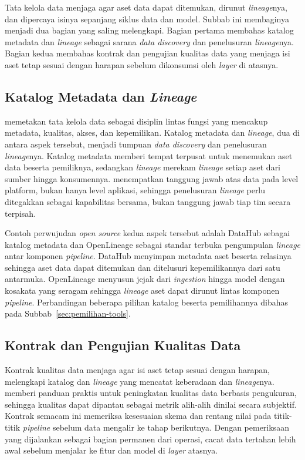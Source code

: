 Tata kelola data menjaga agar aset data dapat ditemukan, dirunut \textit{lineage}nya, dan dipercaya isinya sepanjang siklus data dan model. Subbab ini membaginya menjadi dua bagian yang saling melengkapi. Bagian pertama membahas katalog metadata dan \textit{lineage} sebagai sarana \textit{data discovery} dan penelusuran \textit{lineage}nya. Bagian kedua membahas kontrak dan pengujian kualitas data yang menjaga isi aset tetap sesuai dengan harapan sebelum dikonsumsi oleh \textit{layer} di atasnya.

\subsection{Katalog Metadata dan \textit{Lineage}}
\label{subsec:teori-katalog-lineage}

\textcite{bernardo2024data} memetakan tata kelola data sebagai disiplin lintas fungsi yang mencakup metadata, kualitas, akses, dan kepemilikan. Katalog metadata dan \textit{lineage}, dua di antara aspek tersebut, menjadi tumpuan \textit{data discovery} dan penelusuran \textit{lineage}nya. Katalog metadata memberi tempat terpusat untuk menemukan aset data beserta pemiliknya, sedangkan \textit{lineage} merekam \textit{lineage} setiap aset dari sumber hingga konsumennya. \textcite{stoyanovich2020responsible} menempatkan tanggung jawab atas data pada level platform, bukan hanya level aplikasi, sehingga penelusuran \textit{lineage} perlu ditegakkan sebagai kapabilitas bersama, bukan tanggung jawab tiap tim secara terpisah.

Contoh perwujudan \textit{open source} kedua aspek tersebut adalah DataHub \autocite{datahub2024} sebagai katalog metadata dan OpenLineage \autocite{openlineage2025} sebagai standar terbuka pengumpulan \textit{lineage} antar komponen \textit{pipeline}. DataHub menyimpan metadata aset beserta relasinya sehingga aset data dapat ditemukan dan ditelusuri kepemilikannya dari satu antarmuka. OpenLineage menyusun jejak dari \textit{ingestion} hingga model dengan kosakata yang seragam sehingga \textit{lineage} aset dapat dirunut lintas komponen \textit{pipeline}. Perbandingan beberapa pilihan katalog beserta pemilihannya dibahas pada Subbab~\ref{sec:pemilihan-tools}.

\subsection{Kontrak dan Pengujian Kualitas Data}
\label{subsec:kualitas-data}

Kontrak kualitas data menjaga agar isi aset tetap sesuai dengan harapan, melengkapi katalog dan \textit{lineage} yang mencatat keberadaan dan \textit{lineage}nya. \textcite{chien2022improve} memberi panduan praktis untuk peningkatan kualitas data berbasis pengukuran, sehingga kualitas dapat dipantau sebagai metrik alih-alih dinilai secara subjektif. Kontrak semacam ini memeriksa kesesuaian skema dan rentang nilai pada titik-titik \textit{pipeline} sebelum data mengalir ke tahap berikutnya. Dengan pemeriksaan yang dijalankan sebagai bagian permanen dari operasi, cacat data tertahan lebih awal sebelum menjalar ke fitur dan model di \textit{layer} atasnya.

